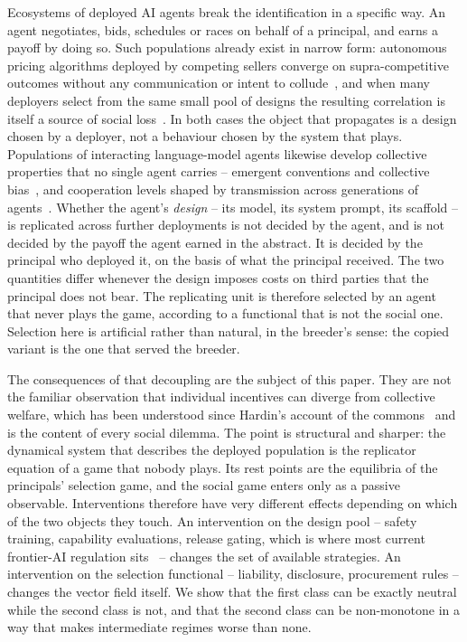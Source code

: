 \documentclass[11pt,a4paper]{article}
\theoremstyle{definition}
\begin{document}
Ecosystems of deployed AI agents break the identification in a specific way.
An agent negotiates, bids, schedules or races on behalf of a principal, and
earns a payoff by doing so. Such populations already exist in narrow form:
autonomous pricing algorithms deployed by competing sellers converge on
supra-competitive outcomes without any communication or intent to
collude~\citep{calvano2020collusion}, and when many deployers select from the
same small pool of designs the resulting correlation is itself a source of
social loss~\citep{kleinberg2021monoculture}. In both cases the object that
propagates is a design chosen by a deployer, not a behaviour chosen by the
system that plays. Populations of interacting language-model agents likewise
develop collective properties that no single agent carries -- emergent
conventions and collective bias~\citep{ashery2025emergent}, and cooperation
levels shaped by transmission across generations of
agents~\citep{vallinder2024cultural,willis2025llm}. Whether the agent's \emph{design} -- its model,
its system prompt, its scaffold -- is replicated across further deployments
is not decided by the agent, and is not decided by the payoff the agent earned
in the abstract. It is decided by the principal who deployed it, on the basis
of what the principal received. The two quantities differ whenever the design
imposes costs on third parties that the principal does not bear. The
replicating unit is therefore selected by an agent that never plays the game,
according to a functional that is not the social one. Selection here is
artificial rather than natural, in the breeder's sense: the copied variant is
the one that served the breeder.

The consequences of that decoupling are the subject of this paper. They are
not the familiar observation that individual incentives can diverge from
collective welfare, which has been understood since Hardin's account of the
commons~\citep{hardin1968tragedy,ostrom1990governing} and is the content of
every social dilemma.
The point is structural and sharper: the dynamical system that describes the
deployed population is the replicator equation of a game that nobody plays.
Its rest points are the equilibria of the principals' selection game, and the
social game enters only as a passive observable. Interventions therefore have
very different effects depending on which of the two objects they touch. An
intervention on the design pool -- safety training, capability evaluations,
release gating, which is where most current frontier-AI regulation
sits~\citep{anderljung2023frontier,euaiact2024} -- changes the set of
available strategies. An intervention on the selection functional --
liability, disclosure, procurement rules -- changes the vector field itself.
We show that the first class can be exactly
neutral while the second class is not, and that the second class can be
non-monotone in a way that makes intermediate regimes worse than none.
\end{document}
